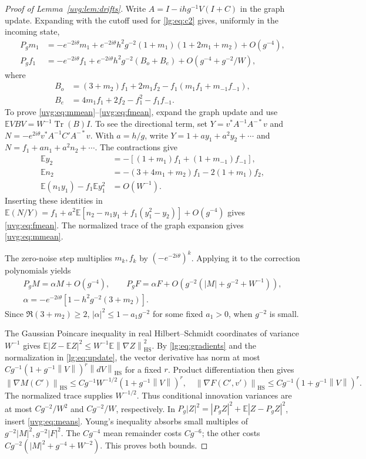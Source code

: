 \documentclass[11pt]{article}
\numberwithin{equation}{section}
\theoremstyle{remark}
\newcommand{\E}{\mathbb E}
\newcommand{\Tr}{\operatorname{Tr}}
\newcommand{\HS}{\mathrm{HS}}
\newcommand{\norm}[1]{\left\|#1\right\|}
\begin{document}
\begin{proof}[Proof of Lemma~\ref{uvg:lem:drifts}]
Write $A=I-ihg^{-1}V(I+C)$ in the graph update. Expanding with the cutoff used
for \eqref{lg:eq:c2} gives, uniformly in the incoming state,
\begin{align}
 P_gm_1&=-e^{-2i\theta}m_1+e^{-2i\theta}h^2g^{-2}(1+m_1)(1+2m_1+m_2)+O(g^{-4}),
 \label{uvg:eq:mmean}\\
 P_gf_1&=-e^{-2i\theta}f_1+e^{-2i\theta}h^2g^{-2}(B_o+B_e)+O(g^{-4}+g^{-2}/W),
 \label{uvg:eq:fmean}
\end{align}
where
\[
 \begin{aligned}
 B_o&=(3+m_2)f_1+2m_1f_2-f_1(m_1f_1+m_{-1}f_{-1}),\\
 B_e&=4m_1f_1+2f_2-f_1^2-f_1f_{-1}.
 \end{aligned}
\]
To prove \eqref{uvg:eq:mmean}--\eqref{uvg:eq:fmean},
expand the graph update and use
$\E VBV=W^{-1}\Tr(B)I$. To see the directional term, set
$Y=v^*A^{-1}A^{-*}v$ and
$N=-e^{2i\theta}v^*A^{-1}C'A^{-*}v$. With $a=h/g$, write
$Y=1+ay_1+a^2y_2+\cdots$ and $N=f_1+an_1+a^2n_2+\cdots$.
The contractions give
\[
 \begin{aligned}
 \E y_2&=-[(1+m_1)f_1+(1+m_{-1})f_{-1}],\\
 \E n_2&=-(3+4m_1+m_2)f_1-2(1+m_1)f_2,\\
 \E(n_1y_1)-f_1\E y_1^2&=O(W^{-1}).
 \end{aligned}
\]
Inserting these identities in
$\E(N/Y)=f_1+a^2\E[n_2-n_1y_1+f_1(y_1^2-y_2)]+O(g^{-4})$
gives \eqref{uvg:eq:fmean}. The normalized trace of the graph
expansion gives \eqref{uvg:eq:mmean}.

The zero-noise step multiplies \(m_k,f_k\) by \((-e^{-2i\theta})^k\).
Applying it to the correction polynomials yields
\begin{equation}\label{uvg:eq:means}
 \begin{gathered}
 P_gM=\alpha M+O(g^{-4}),\qquad
 P_gF=\alpha F+O(g^{-2}(|M|+g^{-2}+W^{-1})),\\
 \alpha=-e^{-2i\theta}[1-h^2g^{-2}(3+m_2)].
 \end{gathered}
\end{equation}
Since \(\Re(3+m_2)\ge2\), \(|\alpha|^2\le1-a_1g^{-2}\)
for some fixed \(a_1>0\), when \(g^{-2}\) is small.

The Gaussian Poincare inequality in real Hilbert--Schmidt
coordinates of variance \(W^{-1}\) gives
\(\E|Z-\E Z|^2\le W^{-1}\E\norm{\nabla Z}_{\HS}^2\).
By \eqref{lg:eq:gradients} and the normalization in \eqref{lg:eq:update},
the vector derivative has norm at most
\(Cg^{-1}(1+g^{-1}\norm V)^r\norm{dV}_{\HS}\)
for a fixed \(r\). Product differentiation then gives
\[
 \norm{\nabla M(C')}_{\HS}\le
 Cg^{-1}W^{-1/2}(1+g^{-1}\norm V)^r,\quad
 \norm{\nabla F(C',v')}_{\HS}\le
 Cg^{-1}(1+g^{-1}\norm V)^r.
\]
The normalized trace supplies \(W^{-1/2}\).
Thus conditional innovation variances are at most \(Cg^{-2}/W^2\)
and \(Cg^{-2}/W\), respectively. In
\(P_g|Z|^2=|P_gZ|^2+\E|Z-P_gZ|^2\), insert \eqref{uvg:eq:means}.
Young's inequality absorbs small multiples of \(g^{-2}|M|^2,g^{-2}|F|^2\).
The \(Cg^{-4}\) mean remainder costs \(Cg^{-6}\); the other costs
\(Cg^{-2}(|M|^2+g^{-4}+W^{-2})\). This proves both bounds.
\end{proof}
\end{document}
